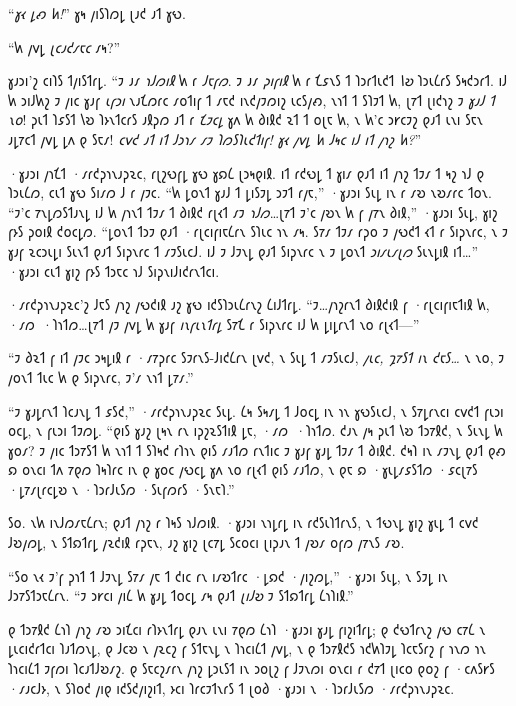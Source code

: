 “\emph{𐑣𐑬 𐑛𐑺 𐑿!}” 𐑣𐑰 𐑢𐑦𐑕𐑐𐑼𐑛 𐑚𐑨𐑒 𐑨𐑑 𐑣𐑻.

“𐑿 𐑢𐑫𐑛 \emph{𐑚𐑤𐑨𐑒𐑥𐑱𐑤} 𐑥𐑰?”

𐑣𐑨𐑮𐑦'𐑟 𐑤𐑦𐑐𐑕 𐑑𐑢𐑦𐑕𐑑𐑩𐑛. “𐑲 𐑨𐑥 \emph{𐑪𐑓𐑼𐑦𐑙} 𐑿 𐑩 \emph{𐑓𐑱𐑝𐑼}. 𐑲 𐑨𐑥 \emph{𐑜𐑦𐑝𐑦𐑙} 𐑿 𐑩 𐑗𐑭𐑯𐑕 𐑑 𐑐𐑮𐑩𐑑𐑧𐑒𐑑 \emph{𐑘𐑹} 𐑐𐑮𐑧𐑖𐑩𐑕 𐑕𐑰𐑒𐑮𐑩𐑑. 𐑦𐑓 𐑿 𐑮𐑦𐑓𐑿𐑟 𐑲 𐑢𐑦𐑤 𐑣𐑨𐑝 \emph{𐑧𐑝𐑮𐑦} 𐑯𐑨𐑗𐑼𐑩𐑤 𐑥𐑴𐑑𐑦𐑝 𐑑 𐑥𐑱𐑒 𐑦𐑯𐑒𐑢𐑲𐑼𐑦𐑟 𐑧𐑤𐑕𐑢𐑺, 𐑯𐑪𐑑 𐑑 𐑕𐑐𐑲𐑑 𐑿, 𐑚𐑳𐑑 𐑚𐑦𐑒𐑪𐑟 𐑲 \emph{𐑣𐑨𐑓 𐑑 𐑯𐑴}! 𐑜𐑧𐑑 𐑐𐑭𐑕𐑑 𐑘𐑹 𐑐𐑶𐑯𐑑𐑤𐑩𐑕 𐑨𐑙𐑜𐑼 𐑨𐑑 𐑩 \emph{𐑗𐑲𐑤𐑛} 𐑣𐑵 𐑿 𐑔𐑦𐑙𐑒 𐑷𐑑 𐑑 𐑴𐑚𐑱 𐑿, 𐑯 𐑿'𐑤 𐑮𐑾𐑤𐑲𐑟 𐑞𐑨𐑑 𐑧𐑯𐑦 𐑕𐑱𐑯 𐑨𐑛𐑳𐑤𐑑 𐑢𐑫𐑛 𐑛𐑵 𐑞 𐑕𐑱𐑥! \emph{𐑤𐑫𐑒 𐑨𐑑 𐑦𐑑 𐑓𐑮𐑪𐑥 𐑥𐑲 𐑐𐑼𐑕𐑐𐑧𐑒𐑑𐑦𐑝! 𐑣𐑬 𐑢𐑫𐑛 𐑿 𐑓𐑰𐑤 𐑦𐑓 𐑦𐑑 𐑢𐑪𐑟 \emph{𐑿}?}”

·𐑣𐑨𐑮𐑦 𐑢𐑪𐑗𐑑 ·𐑥𐑩𐑒𐑜𐑪𐑯𐑨𐑜𐑷𐑤, 𐑩𐑚𐑟𐑻𐑝𐑛 𐑣𐑻 𐑣𐑸𐑖 𐑚𐑮𐑰𐑞𐑦𐑙. 𐑦𐑑 𐑩𐑒𐑻𐑛 𐑑 𐑣𐑦𐑥 𐑞𐑨𐑑 𐑦𐑑 𐑢𐑪𐑟 𐑑𐑲𐑥 𐑑 𐑰𐑟 𐑪𐑓 𐑞 𐑐𐑮𐑧𐑖𐑼, 𐑤𐑧𐑑 𐑣𐑻 𐑕𐑦𐑥𐑼 𐑓 𐑩 𐑢𐑲𐑤. “𐑿 𐑛𐑴𐑯𐑑 𐑣𐑨𐑓 𐑑 𐑛𐑦𐑕𐑲𐑛 𐑮𐑲𐑑 𐑩𐑢𐑱,” ·𐑣𐑨𐑮𐑦 𐑕𐑧𐑛 𐑦𐑯 𐑩 𐑥𐑹 𐑯𐑹𐑥𐑩𐑤 𐑑𐑴𐑯. “𐑲'𐑤 𐑳𐑯𐑛𐑼𐑕𐑑𐑨𐑯𐑛 𐑦𐑓 𐑿 𐑢𐑪𐑯𐑑 𐑑𐑲𐑥 𐑑 𐑔𐑦𐑙𐑒 𐑩𐑚𐑬𐑑 𐑥𐑲 \emph{𐑪𐑓𐑼}…𐑚𐑳𐑑 𐑲'𐑤 𐑢𐑹𐑯 𐑿 𐑝 𐑢𐑳𐑯 𐑔𐑦𐑙,” ·𐑣𐑨𐑮𐑦 𐑕𐑧𐑛, 𐑣𐑦𐑟 𐑝𐑶𐑕 𐑜𐑴𐑦𐑙 𐑒𐑴𐑤𐑛𐑼. “𐑛𐑴𐑯𐑑 𐑑𐑮𐑲 𐑞𐑨𐑑 ·𐑩𐑚𐑤𐑦𐑝𐑦𐑱𐑖𐑩𐑯 𐑕𐑐𐑧𐑤 𐑪𐑯 𐑥𐑰. 𐑕𐑳𐑥 𐑑𐑲𐑥 𐑩𐑜𐑴 𐑲 𐑢𐑻𐑒𐑑 𐑬𐑑 𐑩 𐑕𐑦𐑜𐑯𐑩𐑤, 𐑯 𐑲 𐑣𐑨𐑝 𐑷𐑤𐑮𐑧𐑛𐑦 𐑕𐑧𐑯𐑑 𐑞𐑨𐑑 𐑕𐑦𐑜𐑯𐑩𐑤 𐑑 𐑥𐑲𐑕𐑧𐑤𐑓. 𐑦𐑓 𐑲 𐑓𐑲𐑯𐑛 𐑞𐑨𐑑 𐑕𐑦𐑜𐑯𐑩𐑤 𐑯 𐑲 𐑛𐑴𐑯𐑑 \emph{𐑮𐑦𐑥𐑧𐑥𐑚𐑼} 𐑕𐑧𐑯𐑛𐑦𐑙 𐑦𐑑…” ·𐑣𐑨𐑮𐑦 𐑤𐑧𐑑 𐑣𐑦𐑟 𐑝𐑶𐑕 𐑑𐑮𐑱𐑤 𐑪𐑓 𐑕𐑦𐑜𐑯𐑦𐑓𐑦𐑒𐑩𐑯𐑑𐑤𐑦.

·𐑥𐑩𐑒𐑜𐑪𐑯𐑨𐑜𐑷𐑤'𐑟 𐑓𐑱𐑕 𐑢𐑪𐑟 𐑢𐑻𐑒𐑦𐑙 𐑨𐑟 𐑣𐑻 𐑦𐑒𐑕𐑐𐑮𐑧𐑖𐑩𐑯𐑟 𐑖𐑦𐑓𐑑𐑩𐑛. “𐑲…𐑢𐑪𐑟𐑩𐑯𐑑 𐑔𐑦𐑙𐑒𐑦𐑙 𐑝 ·𐑩𐑚𐑤𐑦𐑝𐑦𐑱𐑑𐑦𐑙 𐑿, ·𐑥𐑼~·𐑐𐑪𐑑𐑼…𐑚𐑳𐑑 𐑢𐑲 𐑢𐑫𐑛 𐑿 𐑣𐑨𐑝 \emph{𐑦𐑯𐑝𐑧𐑯𐑑𐑩𐑛} 𐑕𐑳𐑗 𐑩 𐑕𐑦𐑜𐑯𐑩𐑤 𐑦𐑓 𐑿 𐑛𐑦𐑛𐑩𐑯𐑑 𐑯𐑴 𐑩𐑚𐑬𐑑—”

“𐑲 𐑔𐑷𐑑 𐑝 𐑦𐑑 𐑢𐑲𐑤 𐑮𐑰𐑛𐑦𐑙 𐑩 ·𐑥𐑳𐑜𐑩𐑤 𐑕𐑲𐑩𐑯𐑕-𐑓𐑦𐑒𐑖𐑩𐑯 𐑚𐑫𐑒, 𐑯 𐑕𐑧𐑛 𐑑 𐑥𐑲𐑕𐑧𐑤𐑓, \emph{𐑢𐑧𐑤, 𐑡𐑳𐑕𐑑 𐑦𐑯 𐑒𐑱𐑕…} 𐑯 𐑯𐑴, 𐑲 𐑢𐑴𐑯𐑑 𐑑𐑧𐑤 𐑿 𐑞 𐑕𐑦𐑜𐑯𐑩𐑤, 𐑲'𐑥 𐑯𐑪𐑑 𐑛𐑳𐑥.”

“𐑲 𐑣𐑨𐑛𐑩𐑯𐑑 𐑐𐑤𐑨𐑯𐑛 𐑑 𐑭𐑕𐑒,” ·𐑥𐑩𐑒𐑜𐑪𐑯𐑨𐑜𐑷𐑤 𐑕𐑧𐑛. 𐑖𐑰 𐑕𐑰𐑥𐑛 𐑑 𐑓𐑴𐑤𐑛 𐑦𐑯 𐑪𐑯 𐑣𐑻𐑕𐑧𐑤𐑓, 𐑯 𐑕𐑳𐑛𐑩𐑯𐑤𐑦 𐑤𐑫𐑒𐑑 𐑝𐑧𐑮𐑦 𐑴𐑤𐑛, 𐑯 𐑝𐑧𐑮𐑦 𐑑𐑲𐑼𐑛. “𐑞𐑦𐑕 𐑣𐑨𐑟 𐑚𐑰𐑯 𐑩𐑯 𐑦𐑜𐑟𐑷𐑕𐑑𐑦𐑙 𐑛𐑱, ·𐑥𐑼~·𐑐𐑪𐑑𐑼. 𐑒𐑨𐑯 𐑢𐑰 𐑜𐑧𐑑 𐑘𐑹 𐑑𐑮𐑳𐑙𐑒, 𐑯 𐑕𐑧𐑯𐑛 𐑿 𐑣𐑴𐑥? 𐑲 𐑢𐑦𐑤 𐑑𐑮𐑳𐑕𐑑 𐑿 𐑯𐑪𐑑 𐑑 𐑕𐑐𐑰𐑒 𐑩𐑐𐑪𐑯 𐑞𐑦𐑕 𐑥𐑨𐑑𐑼 𐑩𐑯𐑑𐑦𐑤 𐑲 𐑣𐑨𐑝 𐑣𐑨𐑛 𐑑𐑲𐑥 𐑑 𐑔𐑦𐑙𐑒. 𐑒𐑰𐑐 𐑦𐑯 𐑥𐑲𐑯𐑛 𐑞𐑨𐑑 𐑞𐑺 𐑸 𐑴𐑯𐑤𐑦 𐑑𐑵 𐑳𐑞𐑼 𐑐𐑰𐑐𐑩𐑤 𐑦𐑯 𐑞 𐑣𐑴𐑤 𐑢𐑻𐑤𐑛 𐑣𐑵 𐑯𐑴 𐑩𐑚𐑬𐑑 𐑞𐑦𐑕 𐑥𐑨𐑑𐑼, 𐑯 𐑞𐑱 𐑸 ·𐑣𐑧𐑛𐑥𐑭𐑕𐑑𐑼 ·𐑭𐑤𐑚𐑳𐑕 ·𐑛𐑳𐑥𐑚𐑩𐑤𐑛𐑹 𐑯 ·𐑐𐑮𐑩𐑓𐑧𐑕𐑼 ·𐑕𐑧𐑝𐑼𐑩𐑕 ·𐑕𐑯𐑱𐑐.”

𐑕𐑴. 𐑯𐑿 𐑦𐑯𐑓𐑼𐑥𐑱𐑖𐑩𐑯; 𐑞𐑨𐑑 𐑢𐑪𐑟 𐑩 𐑐𐑰𐑕 𐑪𐑓𐑼𐑦𐑙. ·𐑣𐑨𐑮𐑦 𐑯𐑪𐑛𐑩𐑛 𐑦𐑯 𐑩𐑒𐑕𐑧𐑐𐑑𐑩𐑯𐑕, 𐑯 𐑑𐑻𐑯𐑛 𐑣𐑦𐑟 𐑣𐑧𐑛 𐑑 𐑤𐑫𐑒 𐑓𐑹𐑢𐑼𐑛, 𐑯 𐑕𐑑𐑸𐑑𐑩𐑛 𐑢𐑷𐑒𐑦𐑙 𐑩𐑜𐑱𐑯, 𐑨𐑟 𐑣𐑦𐑟 𐑚𐑤𐑳𐑛 𐑕𐑤𐑴𐑤𐑦 𐑚𐑦𐑜𐑨𐑯 𐑑 𐑢𐑹𐑥 𐑴𐑝𐑼 𐑢𐑳𐑯𐑕 𐑥𐑹.

“𐑕𐑴 𐑯𐑬 𐑲'𐑝 𐑜𐑪𐑑 𐑑 𐑓𐑲𐑯𐑛 𐑕𐑳𐑥 𐑢𐑱 𐑑 𐑒𐑦𐑤 𐑩𐑯 𐑦𐑥𐑹𐑑𐑩𐑤 ·𐑛𐑸𐑒 ·𐑢𐑦𐑟𐑼𐑛,” ·𐑣𐑨𐑮𐑦 𐑕𐑧𐑛, 𐑯 𐑕𐑲𐑛 𐑦𐑯 𐑓𐑮𐑳𐑕𐑑𐑮𐑱𐑖𐑩𐑯. “𐑲 𐑮𐑾𐑤𐑦 𐑢𐑦𐑖 𐑿 𐑣𐑨𐑛 𐑑𐑴𐑤𐑛 𐑥𐑰 𐑞𐑨𐑑 \emph{𐑚𐑦𐑓𐑹} 𐑲 𐑕𐑑𐑸𐑑𐑩𐑛 𐑖𐑪𐑐𐑦𐑙.”

\later

𐑞 𐑑𐑮𐑳𐑙𐑒 𐑖𐑪𐑐 𐑢𐑪𐑟 𐑥𐑹 𐑮𐑦𐑗𐑤𐑦 𐑩𐑐𐑶𐑯𐑑𐑩𐑛 𐑞𐑨𐑯 𐑧𐑯𐑦 𐑳𐑞𐑼 𐑖𐑪𐑐 ·𐑣𐑨𐑮𐑦 𐑣𐑨𐑛 𐑝𐑦𐑟𐑦𐑑𐑩𐑛; 𐑞 𐑒𐑻𐑑𐑩𐑯𐑟 𐑢𐑻 𐑤𐑳𐑖 𐑯 𐑛𐑧𐑤𐑦𐑒𐑩𐑑𐑤𐑦 𐑐𐑨𐑑𐑼𐑯𐑛, 𐑞 𐑓𐑤𐑹 𐑯 𐑢𐑷𐑤𐑟 𐑝 𐑕𐑑𐑱𐑯𐑛 𐑯 𐑐𐑪𐑤𐑦𐑖𐑑 𐑢𐑫𐑛, 𐑯 𐑞 𐑑𐑮𐑳𐑙𐑒𐑕 𐑪𐑒𐑿𐑐𐑲𐑛 𐑐𐑤𐑱𐑕𐑩𐑟 𐑝 𐑪𐑯𐑼 𐑪𐑯 𐑐𐑪𐑤𐑦𐑖𐑑 𐑲𐑝𐑼𐑦 𐑐𐑤𐑨𐑑𐑓𐑹𐑥𐑟. 𐑞 𐑕𐑱𐑤𐑟𐑥𐑩𐑯 𐑢𐑪𐑟 𐑛𐑮𐑧𐑕𐑑 𐑦𐑯 𐑮𐑴𐑚𐑟 𐑝 𐑓𐑲𐑯𐑼𐑦 𐑴𐑯𐑤𐑦 𐑩 𐑒𐑳𐑑 𐑚𐑦𐑤𐑴 𐑞𐑴𐑟 𐑝 ·𐑤𐑵𐑕𐑾𐑕 ·𐑥𐑨𐑤𐑓𐑶, 𐑯 𐑕𐑐𐑴𐑒 𐑢𐑦𐑞 𐑦𐑒𐑕𐑒𐑢𐑦𐑟𐑦𐑑, 𐑶𐑤𐑦 𐑐𐑩𐑤𐑲𐑑𐑯𐑩𐑕 𐑑 𐑚𐑴𐑔 ·𐑣𐑨𐑮𐑦 𐑯 ·𐑐𐑮𐑩𐑓𐑧𐑕𐑼 ·𐑥𐑩𐑒𐑜𐑪𐑯𐑨𐑜𐑷𐑤.

